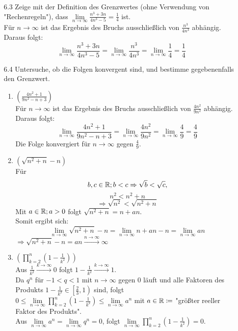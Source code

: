 \documentclass{HM}
\begin{document}
\begin{enumerate}
	\item[6.3] Zeige mit der Definition des Grenzwertes (ohne Verwendung von "Rechenregeln"), dass $\lim\limits_{n\to\infty}\frac{n^3+3n}{4n^3-5}=\frac{1}{4}$ ist.\\
	Für $n\to\infty$ ist das Ergebnis des Bruchs ausschließlich von $\frac{n^3}{4n^3}$ abhängig. Daraus folgt:\\
	$$\lim\limits_{n\to\infty}\frac{n^3+3n}{4n^3-5}=\lim\limits_{n\to\infty}\frac{n^3}{4n^3}=\lim\limits_{n\to\infty}\frac{1}{4}=\frac{1}{4}$$
	\item[6.4] Untersuche, ob die Folgen konvergent sind, und bestimme gegebenenfalls den Grenzwert.
	\begin{enumerate}
		\item $\left(\frac{4n^2+1}{9n^2-n+3}\right)$\\
		Für $n\to\infty$ ist das Ergebnis des Bruchs ausschließlich von $\frac{4n^2}{9n^2}$ abhängig. Daraus folgt:\\
		$$\lim\limits_{n\to\infty}\frac{4n^2+1}{9n^2-n+3}
		=\lim\limits_{n\to\infty}\frac{4n^2}{9n^2}
		=\lim\limits_{n\to\infty}\frac{4}{9}
		=\frac{4}{9}$$
		Die Folge konvergiert für $n\to\infty$ gegen $\frac{4}{9}$.
		
		\item $\left(\sqrt{n^2+n}-n\right)$\\
		Für $$b,c\in\mathbb{R};b<c \Rightarrow\sqrt{b}<\sqrt{c},$$
		$$n^2<n^2+n$$
		$$\Rightarrow\sqrt{n^2}<\sqrt{n^2+n}$$
		Mit $a\in\mathbb{R}; a>0$ folgt $\sqrt{n^2+n}=n+an$.\\
		Somit ergibt sich:
		$$\lim\limits_{n\to\infty}\sqrt{n^2+n}-n
		=\lim\limits_{n\to\infty}n+an-n
		=\lim\limits_{n\to\infty}an$$
		$\Rightarrow \sqrt{n^2+n}-n=an\xrightarrow{n\to\infty}\infty$
		
		\item $\left(\prod\limits_{k=2}^n\left(1-\frac{1}{k^2}\right)\right)$\\
		Aus $\frac{1}{k^2}\xrightarrow{k\to\infty}0$ folgt $1-\frac{1}{k^2}\xrightarrow{k\to\infty}1$.\\
		Da $q^n$ für $-1<q<1$ mit $n\to\infty$ gegen 0 läuft und alle Faktoren des Produkts $1-\frac{1}{k^2} \in\left[\frac{2}{3}, 1\right)$ sind, folgt $0\leq \lim\limits_{n\to\infty}\prod\limits_{k=2}^n\left(1-\frac{1}{k^2}\right) \leq \lim\limits_{n\to\infty}a^n$ mit $a\in\mathbb{R}\coloneqq$ "größter reeller Faktor des Produkts".\\
		Aus $\lim\limits_{n\to\infty}a^n=\lim\limits_{n\to\infty}q^n=0$, folgt $\lim\limits_{n\to\infty}\prod\limits_{k=2}^n\left(1-\frac{1}{k^2}\right) = 0$.
		

\end{enumerate}
\end{enumerate}
\end{document}

